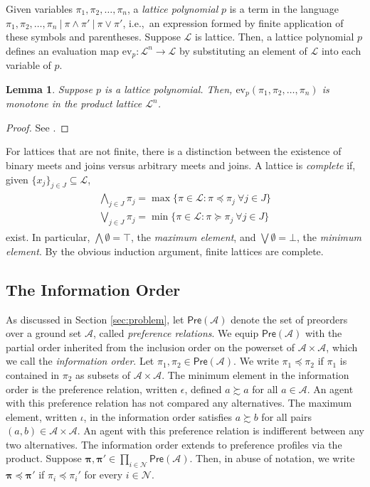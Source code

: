 \documentclass[conference]{ieeeconf}
\renewcommand{\preceq}{\preccurlyeq}
\renewcommand{\succeq}{\succcurlyeq}
\newcommand{\N}{\mathcal{N}}
\newcommand{\A}{\mathcal{A}}
\newcommand{\Pref}{\mathsf{Pre}}
\renewcommand{\L}{\mathcal{L}}
\newcommand{\prefers}{\succsim}
\newcommand{\profile}{\boldsymbol{\pi}}
\newcommand{\join}{\vee}
\newcommand{\meet}{\wedge}
\newcommand{\bigjoin}{\bigvee}
\newcommand{\bigmeet}{\bigwedge}
\newtheorem{lemma}{Lemma}
\begin{document}
Given variables $\pi_1,\pi_2,\dots,\pi_n$, a \emph{lattice polynomial} $p$ is a term in the language $\pi_1,\pi_2,\dots,\pi_n~\vert~\pi \meet \pi'~\vert~\pi \join \pi'$, i.e.,~an expression formed by finite application of these symbols and parentheses. Suppose $\L$ is  lattice. Then, a lattice polynomial $p$ defines an evaluation map $\mathrm{ev}_p: \L^n \to \L$ by substituting an element of $\L$ into each variable of $p$.

\begin{lemma} \label{lem:lattice-polynomial}
    Suppose $p$ is a lattice polynomial. Then, $\mathrm{ev}_p(\pi_1,\pi_2,\dots,\pi_n)$ is monotone in the product lattice $\L^n$.
\end{lemma}
\begin{proof}
    See \cite[\S II.5 Lemma 4]{birkhoff1940}.
\end{proof}

For lattices that are not finite, there is a distinction between the existence of binary meets and joins versus arbitrary meets and joins. A lattice is \emph{complete} if, given $\{x_j\}_{j \in J} \subseteq \L$,
\begin{align}
    \begin{aligned}
        \bigmeet_{j \in J} \pi_j = \max\{\pi \in \L : \pi \preceq \pi_j~\forall j \in J\} \\
        \bigjoin_{j \in J} \pi_j  = \min\{\pi \in \L : \pi \succeq \pi_j~\forall j \in J\}
    \end{aligned} \label{eq:complete lattice}
\end{align}
exist. In particular, $\bigmeet \emptyset = \top$, the \emph{maximum element}, and $\bigjoin \emptyset = \bot$, the \emph{minimum element}. By the obvious induction argument, finite lattices are complete.

\vspace{-0.75em}
\subsection{The Information Order}
\vspace{-0.25em}

As discussed in Section \ref{sec:problem}, let $\Pref(\A)$ denote the set of preorders over a ground set $\A$, called \emph{preference relations}. We equip $\Pref(\A)$ with the partial order inherited from the inclusion order on the powerset of $\A \times \A$, which we call the \emph{information order}. Let $\pi_1, \pi_2 \in \Pref(\A)$. We write $\pi_1 \preceq \pi_2$ if $\pi_1$ is contained in $\pi_2$ as subsets of $\A \times \A$. The minimum element in the information order is the preference relation, written $\epsilon$, defined $a \prefers a$ for all $a \in \A$. An agent with this preference relation has not compared any alternatives. The maximum element, written $\iota$, in the information order satisfies $a \prefers b$ for all pairs $(a,b) \in \A \times \A$. An agent with this preference relation is indifferent between any two alternatives. The information order extends to preference profiles via the product. Suppose $\profile, \profile' \in \prod_{i \in \N}  \Pref(\A)$. Then, in abuse of notation, we write $\profile \preceq \profile'$ if $\pi_i \preceq \pi_i'$ for every $i \in \N$.
\end{document}
